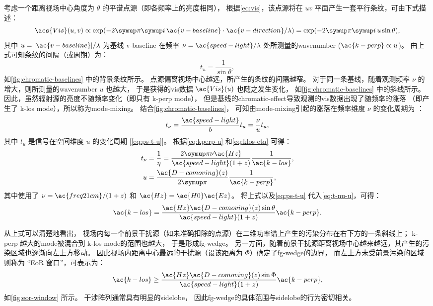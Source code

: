 考虑一个距离视场中心角度为 $\theta$ 的平谱点源（即各频率上的亮度相同），
根据\autoref{eq:vis}，该点源将在 $uv$ 平面产生一套平行条纹，可由下式描述：
\begin{equation}
  \acs{Vis}(u,v)
    \propto \exp (-2\Cpi\Ci\, \ac{v-baseline}\cdot\ac{v-direction} / \lambda)
    = \exp (-2\Cpi\Ci\, u \sin\theta) ,
\end{equation}
其中 $u = |\ac{v-baseline}|/\lambda$ 为基线 \ac{v-baseline}
在频率 $\nu = \ac{speed-light}/\lambda$ 处所测量的\ac{wavenumber}
($\ac{k-perp} \propto u$)。
由上式可知条纹的间隔（或周期）为：
\begin{equation}
  \label{eq:ps-t-u}
  t_u = \frac{1}{\sin\theta} ,
\end{equation}
如\autoref{fig:chromatic-baselines} 中的背景条纹所示。
点源偏离视场中心越远，所产生的条纹的间隔越窄。
对于同一条基线，随着观测频率 $\nu$ 的增大，则所测量的\ac{wavenumber} $u$ 也越大，
于是获得的\ac{vis}数据 $\ac{Vis}(u)$ 也随之发生变化，
如\autoref{fig:chromatic-baselines} 中的斜线所示。
因此，虽然辐射源的亮度不随频率变化（即只有 \ac{k-perp} \ac{mode}），
但是基线的\ac{chromatic-effect}导致观测的\ac{vis}数据出现了随频率的涨落
（即产生了 \ac{k-los} \ac{mode}），所以称为\ac{mode-mixing}。
结合\autoref{fig:chromatic-baselines}，
可知由\ac{mode-mixing}引起的涨落在频率维度 $\nu$ 的变化周期为 \cite{morales2012}：
\begin{equation}
  \label{eq:t-nu-u}
  t_{\nu} = \frac{\ac{speed-light}}{b} t_u
    = \frac{\nu}{u} t_u ,
\end{equation}
其中 $t_u$ 是信号在空间维度 $u$ 的变化周期 [\autoref{eq:ps-t-u}]。
根据\autoref{eq:kperp-u} 和\autoref{eq:klos-eta} 可得：
\begin{align}
  t_{\nu} & = \frac{1}{\eta}
    = \frac{2\Cpi \nu \ac{Hz}}{\ac{speed-light} (1+z)}
      \frac{1}{\ac{k-los}} , \\
  u & = \frac{\ac{D-comoving}(z)}{2\Cpi} \frac{1}{\ac{k-perp}} ,
\end{align}
其中使用了 $\nu = \ac{freq21cm} / (1+z)$ 和 $\ac{Hz} = \ac{H0} \ac{Ez}$。
将上式以及\autoref{eq:ps-t-u} 代入\autoref{eq:t-nu-u}，可得：
\begin{equation}
  \label{eq:klos-kperp}
  \ac{k-los} = \frac{\ac{Hz} \ac{D-comoving}(z) \sin\theta}{
    \ac{speed-light} (1+z)} \ac{k-perp} .
\end{equation}

从上式可以清楚地看出，
视场内每一个前景干扰源（如未准确扣除的点源）在二维功率谱上产生的污染分布在右下方的一条斜线上；
\ac{k-perp} 越大的\ac{mode}被混合到 \ac{k-los} \ac{mode}的范围也越大，
于是形成\ac{fg-wedge}。
另一方面，随着前景干扰源距离视场中心越来越远，其产生的污染区域也逐渐向左上方移动。
因此视场内距离中心最远的干扰源（设该距离为 $\Phi$）确定了\ac{fg-wedge}的边界，
而左上方未受前景污染的区域则称为 \enquote{EoR 窗口}，可表示为：
\begin{equation}
  \ac{k-los} \ge \frac{\ac{Hz} \ac{D-comoving}(z) \sin\Phi}{
    \ac{speed-light} (1+z)} \ac{k-perp} ,
\end{equation}
如\autoref{fig:eor-window} 所示。
干涉阵列通常具有明显的\ac{sidelobe}，
因此\ac{fg-wedge}的具体范围与\ac{sidelobe}的行为密切相关。

